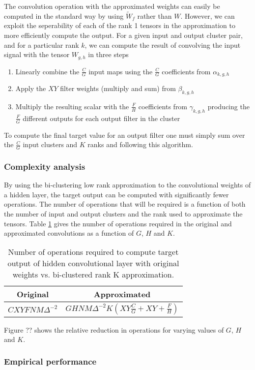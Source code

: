 The convolution operation with the approximated weights can easily be computed in the standard way by using $\tilde{W}_f$ rather than $W$. However, we can exploit the seperability of each of the rank 1 tensors in the approximation to more efficiently compute the output. For a given input and output cluster pair, and for a particular rank $k$, we can compute the result of convolving the input signal with the tensor $W_{g,h}$ in three steps
\begin{enumerate}
\item Linearly combine the $\frac{C}{G}$ input maps using the $\frac{C}{G}$ coefficients from $\alpha_{k, g, h}$
\item Apply the $XY$ filter weights (multiply and sum) from $\beta_{k,g,h}$
\item Multiply the resulting scalar with the $\frac{F}{H}$ coefficients from $\gamma_{k,g,h}$ producing the $\frac{F}{G}$ different outputs for each output filter in the cluster 
\end{enumerate}

To compute the final target value for an output filter one must simply sum over the $\frac{C}{G}$ input clusters and $K$ ranks and following this algorithm.

\subsubsection{Complexity analysis}
By using the bi-clustering low rank approximation to the convolutional weights of a hidden layer, the target output can be computed with significantly fewer operations. The number of operations that will be required is a function of both the number of input and output clusters and the rank used to approximate the tensors. Table \ref{biclustering_ops} gives the number of operations required in the original and approximated convolutions as a function of $G$, $H$ and $K$. 

\begin{table}[h]
\tiny
\parbox{\linewidth}{
\centering
\begin{tabular}{cc}
\hline
Original & Approximated \\
\hline
$C X Y F N M \Delta^{-2}$  & $G H N M \Delta^{-2} K (X Y \frac{C}{G} + X Y + \frac{F}{H} )$ \\
\hline
\end{tabular}
\caption{Number of operations required to compute target output of hidden convolutional layer with original weights vs. bi-clustered rank K approximation.}
\label{biclustering_ops}
}
\end{table}

Figure ?? shows the relative reduction in operations for varying values of $G$, $H$ and $K$.
\subsubsection{Empirical performance}


